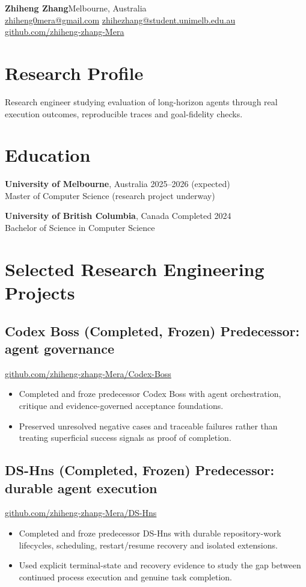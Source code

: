 \documentclass[10pt,a4paper]{article}
\begin{document}
{\LARGE\bfseries Zhiheng Zhang}\hfill Melbourne, Australia\\
\href{mailto:zhiheng0mera@gmail.com}{zhiheng0mera@gmail.com}\quad
\href{mailto:zhihezhang@student.unimelb.edu.au}{zhihezhang@student.unimelb.edu.au}\\
\href{https://github.com/zhiheng-zhang-Mera}{github.com/zhiheng-zhang-Mera}

\section{Research Profile}
Research engineer studying evaluation of long-horizon agents through real execution outcomes, reproducible traces and goal-fidelity checks.

\section{Education}
\textbf{University of Melbourne}, Australia \hfill 2025--2026 (expected)\\
Master of Computer Science (research project underway)

\textbf{University of British Columbia}, Canada \hfill Completed 2024\\
Bachelor of Science in Computer Science

\section{Selected Research Engineering Projects}
\subsection*{Codex Boss (Completed, Frozen) \hfill \small Predecessor: agent governance}
\href{https://github.com/zhiheng-zhang-Mera/Codex-Boss}{github.com/zhiheng-zhang-Mera/Codex-Boss}
\begin{itemize}
\item Completed and froze predecessor Codex Boss with agent orchestration, critique and evidence-governed acceptance foundations.
\item Preserved unresolved negative cases and traceable failures rather than treating superficial success signals as proof of completion.
\end{itemize}

\subsection*{DS-Hns (Completed, Frozen) \hfill \small Predecessor: durable agent execution}
\href{https://github.com/zhiheng-zhang-Mera/DS-Hns}{github.com/zhiheng-zhang-Mera/DS-Hns}
\begin{itemize}
\item Completed and froze predecessor DS-Hns with durable repository-work lifecycles, scheduling, restart/resume recovery and isolated extensions.
\item Used explicit terminal-state and recovery evidence to study the gap between continued process execution and genuine task completion.
\end{itemize}
\end{document}

